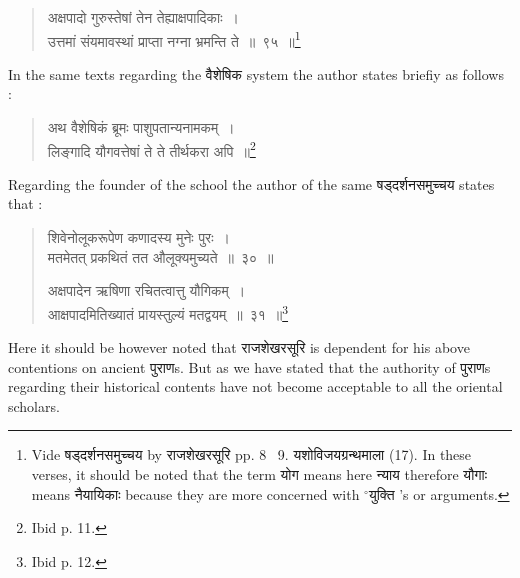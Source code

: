 \documentclass[11pt, openany]{book}
\begin{document}
\newpage
\begin{quote}
{\knui अक्षपादो गुरुस्तेषां तेन तेह्याक्षपादिकाः~।\\
उत्तमां संयमावस्थां प्राप्ता नग्ना भ्रमन्ति ते~॥~९५~॥\renewcommand{\thefootnote}{1}\footnote{Vide षड्दर्शनसमुच्चय by राजशेखरसूरि pp. 8 \textendash\ 9. यशोविजयग्रन्थमाला (17). In these verses, it should be noted that the term योग means here न्याय therefore यौगाः means नैयायिकाः because they are more concerned with ${}^\circ$युक्ति 's or arguments.}}
\end{quote}

\vspace{-3mm}
In the same texts regarding the वैशेषिक system the author states briefiy as follows :\textendash\

\vspace{-3mm}
\begin{quote}
{\knui अथ वैशेषिकं ब्रूमः पाशुपतान्यनामकम्~।\\
लिङ्गादि यौगवत्तेषां ते ते तीर्थकरा अपि~॥\renewcommand{\thefootnote}{2}\footnote{Ibid p. 11.}}
\end{quote}

\vspace{-3mm}
Regarding the founder of the school the author of the same षड्दर्शनसमुच्चय states that :\textendash\

\vspace{-3mm}
\begin{quote}
{\knui शिवेनोलूकरूपेण कणादस्य मुनेः पुरः~।\\
मतमेतत् प्रकथितं तत औलूक्यमुच्यते~॥~३०~॥

अक्षपादेन ऋषिणा रचितत्वात्तु यौगिकम्~।\\
आक्षपादमितिख्यातं प्रायस्तुल्यं मतद्वयम्~॥~३१~॥\renewcommand{\thefootnote}{3}\footnote{Ibid p. 12.}}
\end{quote}

\vspace{-3mm}
\noindent
Here it should be however noted that राजशेखरसूरि is dependent for his above contentions on ancient पुराणs. But as we have stated that the authority of पुराणs regarding their historical contents have not become acceptable to all the oriental scholars.
\end{document}
